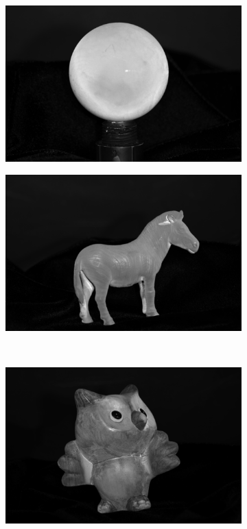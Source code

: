 \documentclass{paper}
\begin{document}
\begin{figure}[h!]
\begin{subfigure}{0.3\textwidth}
                \includegraphics[width=\textwidth]{report_fig/gray_a}
        \end{subfigure}
        \begin{subfigure}{0.3\textwidth}
                \includegraphics[width=\textwidth]{report_fig/horse_a}
        \end{subfigure}
        ~ 
        \begin{subfigure}{0.3\textwidth}
                \includegraphics[width=\textwidth]{report_fig/owl_a}

\end{subfigure}
\end{figure}
\end{document}
